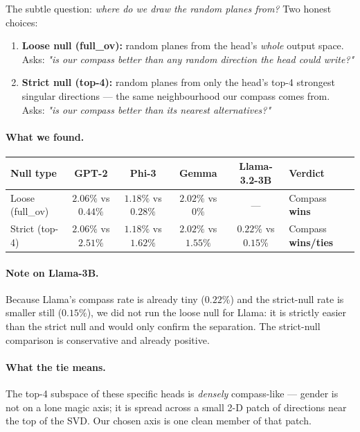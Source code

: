\documentclass[11pt]{article}
\begin{document}
The subtle question: \emph{where do we draw the random planes from?}
Two honest choices:
\begin{enumerate}[leftmargin=*,nosep]
    \item \textbf{Loose null (full\_ov):} random planes from the head's \emph{whole} output space. Asks: \emph{"is our compass better than any random direction the head could write?"}
    \item \textbf{Strict null (top-4):} random planes from only the head's top-4 strongest singular directions --- the same neighbourhood our compass comes from. Asks: \emph{"is our compass better than its nearest alternatives?"}
\end{enumerate}

\paragraph{What we found.}
\begin{center}
\small
\begin{tabular}{lcccc l}
\toprule
Null type & GPT-2 & Phi-3 & Gemma & Llama-3.2-3B & Verdict \\
\midrule
Loose (full\_ov) & $2.06\%$ vs $0.44\%$ & $1.18\%$ vs $0.28\%$ & $2.02\%$ vs $0\%$ & --- & Compass \textbf{wins} \\
Strict (top-4)   & $2.06\%$ vs $2.51\%$ & $1.18\%$ vs $1.62\%$ & $2.02\%$ vs $1.55\%$ & $0.22\%$ vs $0.15\%$ & Compass \textbf{wins/ties}  \\
\bottomrule
\end{tabular}
\end{center}

\paragraph{Note on Llama-3B.} Because Llama's compass rate is already
tiny ($0.22\%$) and the strict-null rate is smaller still ($0.15\%$),
we did not run the loose null for Llama: it is strictly easier than
the strict null and would only confirm the separation. The strict-null
comparison is conservative and already positive.
\paragraph{What the tie means.} The top-4 subspace of these specific
heads is \emph{densely} compass-like --- gender is not on a lone magic
axis; it is spread across a small 2-D patch of directions near the top
of the SVD. Our chosen axis is one clean member of that patch.
\end{document}
